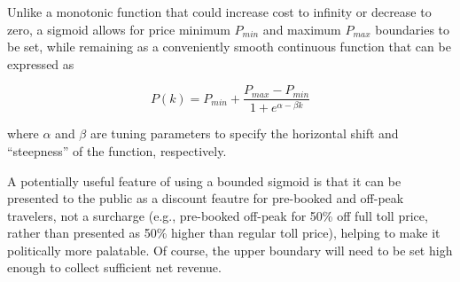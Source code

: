 \documentclass[10pt, letter, twocolumn]{article} %
\begin{document}
\noindent Unlike a monotonic function that could increase cost to infinity or decrease to zero, a sigmoid allows for price minimum $P_{min}$ and maximum $P_{max}$ boundaries to be set, while remaining as a conveniently smooth continuous function that can be expressed as

\begin{equation}
P(k) = P_{min} + \frac{P_{max} - P_{min}}{1 + e^{\alpha - \beta k}}
\label{eq:price}
\end{equation}

\noindent where $\alpha$ and $\beta$ are tuning parameters to specify the horizontal shift and ``steepness'' of the function, respectively. 

A potentially useful feature of using a bounded sigmoid is that it can be presented to the public as a discount feautre for pre-booked and off-peak travelers, not a surcharge (e.g., pre-booked off-peak for 50\% off full toll price, rather than presented as 50\% higher than regular toll price), helping to make it politically more palatable. Of course, the upper boundary will need to be set high enough to collect sufficient net revenue.
\end{document}
